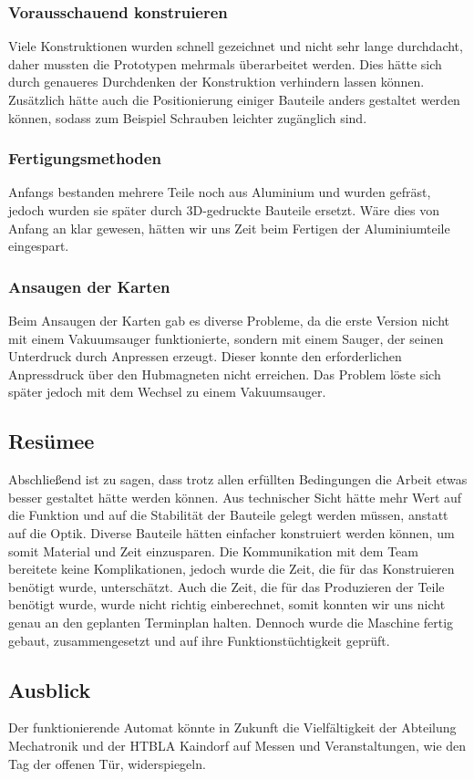 \subsubsection{Vorausschauend konstruieren}
Viele Konstruktionen wurden schnell gezeichnet und nicht sehr lange durchdacht, daher mussten die Prototypen mehrmals überarbeitet werden.
Dies hätte sich durch genaueres Durchdenken der Konstruktion verhindern lassen können.
Zusätzlich hätte auch die Positionierung einiger Bauteile anders gestaltet werden können, sodass zum Beispiel Schrauben leichter zugänglich sind.

\subsubsection{Fertigungsmethoden}
Anfangs bestanden mehrere Teile noch aus Aluminium und wurden gefräst, jedoch wurden sie später durch 3D-gedruckte
Bauteile ersetzt.
Wäre dies von Anfang an klar gewesen, hätten wir uns Zeit beim Fertigen der Aluminiumteile eingespart.
\subsubsection{Ansaugen der Karten}
Beim Ansaugen der Karten gab es diverse Probleme, da die erste Version nicht mit einem Vakuumsauger funktionierte, sondern
mit einem Sauger, der seinen Unterdruck durch Anpressen erzeugt.
Dieser konnte den erforderlichen Anpressdruck über den Hubmagneten nicht erreichen.
Das Problem löste sich später jedoch mit dem Wechsel zu einem Vakuumsauger.

\subsection{Resümee}
Abschließend ist zu sagen, dass trotz allen erfüllten Bedingungen die Arbeit etwas besser gestaltet hätte werden können.
Aus technischer Sicht hätte mehr Wert auf die Funktion und auf die Stabilität der Bauteile gelegt werden müssen, anstatt
auf die Optik.
Diverse Bauteile hätten einfacher konstruiert werden können, um somit Material und Zeit einzusparen.
Die Kommunikation mit dem Team bereitete keine Komplikationen, jedoch wurde die Zeit, die für das Konstruieren benötigt wurde, unterschätzt.
Auch die Zeit, die für das Produzieren der Teile benötigt wurde, wurde nicht richtig einberechnet, somit
konnten wir uns nicht genau an den geplanten Terminplan halten.
Dennoch wurde die Maschine fertig gebaut, zusammengesetzt
und auf ihre Funktionstüchtigkeit geprüft.

\subsection{Ausblick}
Der funktionierende Automat könnte in Zukunft die Vielfältigkeit der Abteilung Mechatronik und der HTBLA Kaindorf auf
Messen und Veranstaltungen, wie den Tag der offenen Tür, widerspiegeln.